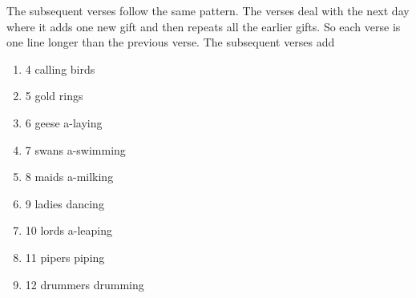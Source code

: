 \documentclass{article}
\theoremstyle{definition}
\begin{document}
\smallskip
\noindent
The subsequent verses follow the same pattern. The verses deal
with the next day where it adds one new gift and then repeats all the
earlier gifts. So each verse is one line longer than the previous
verse. The subsequent verses add

\vspace{0.375em}
 \begin{enumerate}
   \addtocounter{enumi}{3}                                                                      %
   \item 4 calling birds
   \item 5 gold rings
   \item 6 geese a-laying
   \item 7 swans a-swimming
   \item 8 maids a-milking
   \item 9 ladies dancing
   \item 10 lords a-leaping
   \item 11 pipers piping
   \item 12 drummers drumming
 \end{enumerate}


% 
% 
\end{document}
